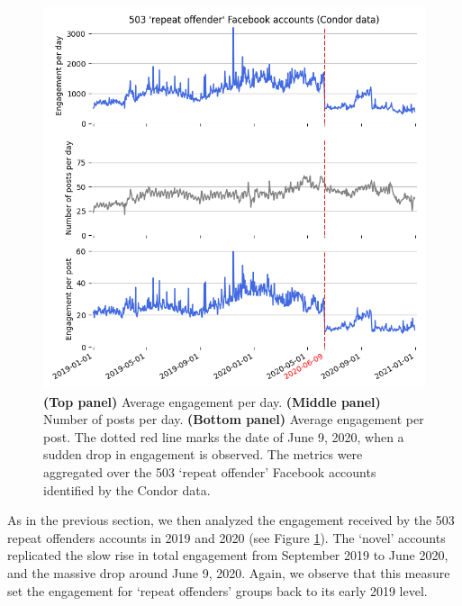 \documentclass[review]{elsarticle}
\begin{document}
\begin{figure}[!h]
\centering
\includegraphics[scale=0.5]{./../figure/condor_average_timeseries.png}
\caption{
{\bf(Top panel)} Average engagement per day. 
{\bf(Middle panel)} Number of posts per day. 
{\bf(Bottom panel)} Average engagement per post. 
The dotted red line marks the date of June 9, 2020, when a sudden drop in engagement is observed.
The metrics were aggregated over the 503 `repeat offender' Facebook accounts identified by the Condor data.
}
\label{condor_average_timeseries}
\end{figure}

As in the previous section, we then analyzed the engagement received by the 503 repeat offenders accounts in 2019 and 2020 (see Figure \ref{condor_average_timeseries}). 
The `novel' accounts replicated the slow rise in total engagement from September 2019 to June 2020, and the massive drop around June 9, 2020.
Again, we observe that this measure set the engagement for ‘repeat offenders’ groups back to its early 2019 level.
\end{document}
